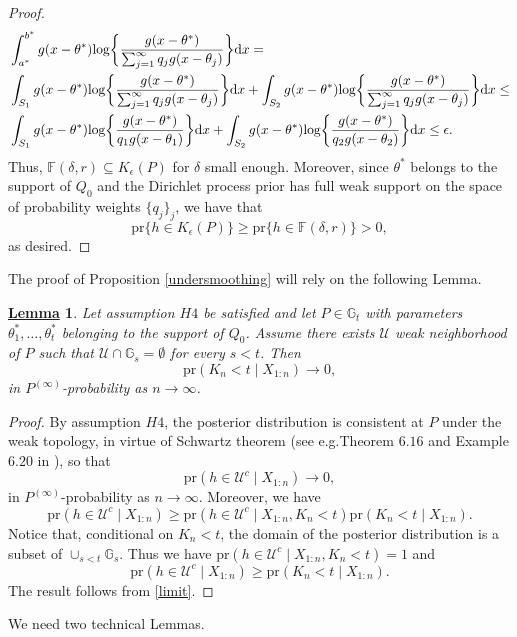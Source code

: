 \documentclass[12pt]{article}
\newtheorem{Lem}{\underline{\bf Lemma}}
\def\log{\hbox{log}}
\begin{document}
\begin{proof}
\begin{align*}
&\int_{a^*}^{b^*} g(x-\theta^\ast) \log\bigg\{\frac{g(x-\theta^\ast)}{\sum_{j=1}^{\infty} q_{j} g(x-\theta_{j})} \bigg\}  \mathrm{d}x =\\
&\int_{S_1} g(x-\theta^\ast) \log\bigg\{\frac{g(x-\theta^\ast)}{\sum_{j=1}^{\infty} q_{j} g(x-\theta_{j})} \bigg\}  \mathrm{d}x +
\int_{S_2} g(x-\theta^\ast) \log\bigg\{\frac{g(x-\theta^\ast)}{\sum_{j=1}^{\infty} q_{j} g(x-\theta_{j})} \bigg\}  \mathrm{d}x \le\\
& \int_{S_1} g(x-\theta^\ast) \log\bigg\{\frac{g(x-\theta^\ast)}{ q_{1} g(x-\theta_{1})} \bigg\}  \mathrm{d}x +
\int_{S_2} g(x-\theta^\ast) \log\bigg\{\frac{g(x-\theta^\ast)}{ q_{2} g(x-\theta_{2})} \bigg\}  \mathrm{d}x \le \epsilon.
\end{align*}
Thus, $\mathbb{F}(\delta, r)\subseteq K_\epsilon(P)$ for $\delta$ small enough.
Moreover, since $\theta^*$ belongs to the support of $Q_0$ and the Dirichlet process prior has full weak support on the space of probability weights $\{ q_j \}_j$, we have that
\[
\text{pr}\{h \in K_\epsilon(P)\} \geq \text{pr}\{h \in \mathbb{F}(\delta, r)\} >0,
\]
as desired.
\end{proof}
The proof of Proposition \ref{undersmoothing} will rely on the following Lemma.
\begin{Lem}\label{lemma_weak_convergence}
Let assumption $H4$ be satisfied and let $P \in \mathbb{G}_t$ with parameters $\theta_1^*, \dots, \theta_t^*$ belonging to the support of $Q_0$. Assume there exists $\mathcal{U}$ weak neighborhood of $P$ such that $\mathcal{U} \cap \mathbb{G}_s = \emptyset$ for every $s < t$. Then
\[
\text{pr}\left(K_n < t \mid X_{1:n} \right) \to 0,
\]
in $P^{(\infty)}$-probability as $n \to \infty$.
\end{Lem}
\begin{proof}
By assumption $H4$, the posterior distribution is consistent at $P$ under the weak topology, in virtue of Schwartz theorem (see e.g.Theorem $6.16$ and Example $6.20$ in \cite{Subhashis2017}), so that
\begin{equation}\label{limit}
\text{pr}(h \in \mathcal{U}^c \mid X_{1:n}) \to 0,
\end{equation}
in $P^{(\infty)}$-probability as $n \to \infty$. Moreover, we have
\[
\text{pr}(h \in \mathcal{U}^c \mid X_{1:n}) \geq \text{pr}(h \in \mathcal{U}^c \mid X_{1:n}, K_n < t)\text{pr}\left(K_n < t \mid X_{1:n} \right).
\]
Notice that, conditional on $K_n < t$, the domain of the posterior distribution is a subset of $\cup_{s < t}\mathbb{G}_s$. Thus we have $\text{pr}(h \in \mathcal{U}^c \mid X_{1:n}, K_n < t) = 1$ and
\[
\text{pr}(h \in \mathcal{U}^c \mid X_{1:n}) \geq \text{pr}\left(K_n < t \mid X_{1:n} \right).
\]
The result follows from \eqref{limit}.
\end{proof}
We need two technical Lemmas.
\end{document}
